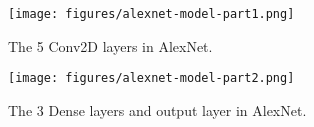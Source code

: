 \begin{figure}[H]
    \centering
    \texttt{[image: figures/alexnet-model-part1.png]}
    \caption{The 5 Conv2D layers in AlexNet.}
    \label{fig:alexnet-model-part1}
\end{figure}
\begin{figure}[H]
    \centering
    \texttt{[image: figures/alexnet-model-part2.png]}
    \caption{The 3 Dense layers and output layer in AlexNet.}
    \label{fig:alexnet-model-part2}
\end{figure}